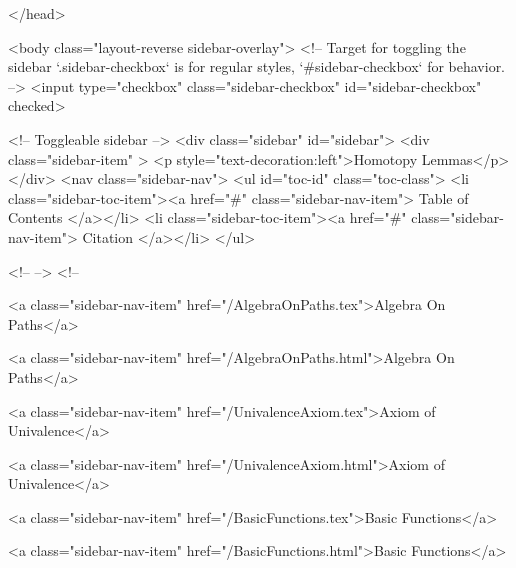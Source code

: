   
</head>




  <body class="layout-reverse sidebar-overlay">
    <!-- Target for toggling the sidebar `.sidebar-checkbox` is for regular
     styles, `#sidebar-checkbox` for behavior. -->
<input type="checkbox" class="sidebar-checkbox" id="sidebar-checkbox" checked>

<!-- Toggleable sidebar -->
<div class="sidebar" id="sidebar">
  <div class="sidebar-item" >
    <p style="text-decoration:left">Homotopy Lemmas</p>
  </div>
  <nav class="sidebar-nav">
    <ul id="toc-id" class="toc-class">
  <li class="sidebar-toc-item"><a href="#" class="sidebar-nav-item"> Table of Contents </a></li>
  <li class="sidebar-toc-item"><a href="#" class="sidebar-nav-item"> Citation </a></li>
</ul>


    <!--  -->
    <!-- 
      
    
      
    
      
    
      
        
      
    
      
        
          <a class="sidebar-nav-item" href="/AlgebraOnPaths.tex">Algebra On Paths</a>
        
      
    
      
        
          <a class="sidebar-nav-item" href="/AlgebraOnPaths.html">Algebra On Paths</a>
        
      
    
      
        
          <a class="sidebar-nav-item" href="/UnivalenceAxiom.tex">Axiom of Univalence</a>
        
      
    
      
        
          <a class="sidebar-nav-item" href="/UnivalenceAxiom.html">Axiom of Univalence</a>
        
      
    
      
        
          <a class="sidebar-nav-item" href="/BasicFunctions.tex">Basic Functions</a>
        
      
    
      
        
          <a class="sidebar-nav-item" href="/BasicFunctions.html">Basic Functions</a>
        
      
    
